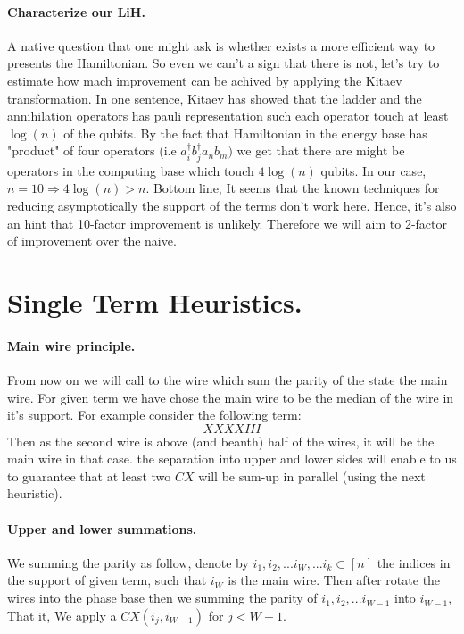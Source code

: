 \documentclass{article}
\begin{document}
\begin{multicols*}{2}
\paragraph{Characterize our \textbf{LiH}.} A native question that one might ask is whether exists a more efficient way to presents the Hamiltonian. So even we can't a sign that there is not, let's try to estimate how mach improvement can be achived by applying the Kitaev transformation. In one sentence, Kitaev has showed that the ladder and the annihilation operators has pauli representation such each operator touch at least \( \log\left(n\right) \) of the qubits. By the fact that Hamiltonian in the energy base has "product" of four operators (i.e \( a^{\dagger}_{i}b^{\dagger}_{j}a_{n}b_{m}) \) we get that there are might be operators in the computing base which touch \(4\log\left(n\right)\) qubits. In our case, \(n = 10 \Rightarrow 4\log\left(n\right) > n \). 
Bottom line, It seems that the known techniques for reducing asymptotically the support of the terms don't work here. Hence, it's also an hint that 10-factor improvement is unlikely. Therefore we will aim to 2-factor of improvement over the naive.    

\section{Single Term Heuristics.}

\paragraph{Main wire principle.} From now on we will call to the wire which sum the parity of the state the main wire. For given term we have chose the main wire to be the median of the wire in it's support. For example consider the following term:
\begin{equation*}
    XXXXIII
\end{equation*} 
Then as the second wire is above (and beanth) half of the wires, it will be the main wire in that case. the separation into upper and lower sides will enable to us to guarantee that at least two \(CX\) will be sum-up in parallel (using the next heuristic).
\paragraph{Upper and lower summations.}  We summing the parity as follow, denote by \( i_{1}, i_{2}, ... i_{W} , ... i_{k} \subset [n] \) the indices in the support of given term, such that \(i_{W}\) is the main wire. Then after rotate the wires into the phase base then we summing the parity of \(i_{1}, i_{2}, ... i_{W-1}\) into \(i_{W-1}\), That it, We apply a \(CX\left(i_{j}, i_{W-1}\right)\) for \(j < W-1\). 


\end{multicols*}
\end{document}

